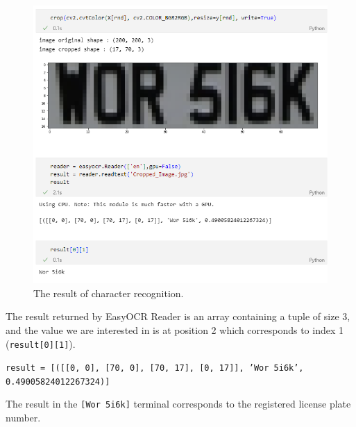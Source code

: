 \documentclass[lnbip]{svmultln}
\begin{document}
	\begin{figure}[H]%
		\centering
		\includegraphics[width=\textwidth]{images/ocr_result_}
		\caption{The result of character recognition.}
		\label{fig:ocr_result}
	\end{figure}
	The result returned by EasyOCR Reader is an array containing a tuple of size 3, and the value we are interested in is at position 2 which corresponds to index 1 (\texttt{result[0][1]}).
	
	\texttt{result = [([[0, 0], [70, 0], [70, 17], [0, 17]], 'Wor 5i6k', 0.49005824012267324)]}
	
	The result in the \texttt{[Wor 5i6k]} terminal corresponds to the registered license plate number.
	
	



%



%
%

\nocite{*}

%
\end{document}
